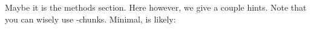 Maybe it is the methods section. Here however, we give a couple hints.
Note that you can wisely use -chunks. Minimal, is likely:
% 
% 
% 
% 
% 
% 
% 
% 
% 
% 
% 
% 
% 
% 
% 
% 
% 

